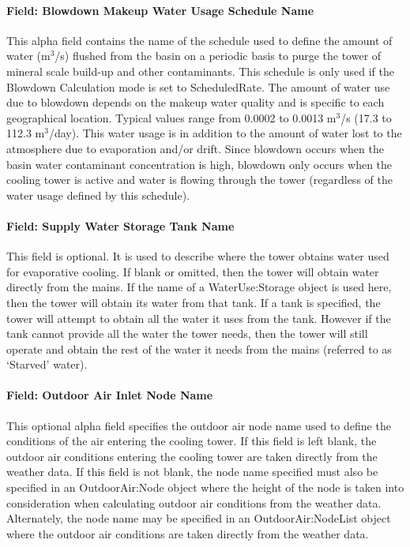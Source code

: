 \paragraph{Field: Blowdown Makeup Water Usage Schedule Name}\label{field-blowdown-makeup-water-usage-schedule-name-1}

This alpha field contains the name of the schedule used to define the amount of water (m\(^{3}\)/s) flushed from the basin on a periodic basis to purge the tower of mineral scale build-up and other contaminants. This schedule is only used if the Blowdown Calculation mode is set to ScheduledRate. The amount of water use due to blowdown depends on the makeup water quality and is specific to each geographical location. Typical values range from 0.0002 to 0.0013 m\(^{3}\)/s (17.3 to 112.3 m\(^{3}\)/day). This water usage is in addition to the amount of water lost to the atmosphere due to evaporation and/or drift. Since blowdown occurs when the basin water contaminant concentration is high, blowdown only occurs when the cooling tower is active and water is flowing through the tower (regardless of the water usage defined by this schedule).

\paragraph{Field: Supply Water Storage Tank Name}\label{field-supply-water-storage-tank-name-1}

This field is optional. It is used to describe where the tower obtains water used for evaporative cooling. If blank or omitted, then the tower will obtain water directly from the mains. If the name of a WaterUse:Storage object is used here, then the tower will obtain its water from that tank. If a tank is specified, the tower will attempt to obtain all the water it uses from the tank. However if the tank cannot provide all the water the tower needs, then the tower will still operate and obtain the rest of the water it needs from the mains (referred to as `Starved' water).

\paragraph{Field: Outdoor Air Inlet Node Name}\label{field-outdoor-air-inlet-node-name-1}

This optional alpha field specifies the outdoor air node name used to define the conditions of the air entering the cooling tower. If this field is left blank, the outdoor air conditions entering the cooling tower are taken directly from the weather data. If this field is not blank, the node name specified must also be specified in an OutdoorAir:Node object where the height of the node is taken into consideration when calculating outdoor air conditions from the weather data. Alternately, the node name may be specified in an OutdoorAir:NodeList object where the outdoor air conditions are taken directly from the weather data.

